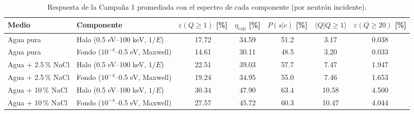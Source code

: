 \documentclass[11pt,a4paper]{article}
\begin{document}
\begin{table}[H]\centering\footnotesize\setlength{\tabcolsep}{3pt}\caption{Respuesta de la Campaña 1 promediada con el espectro de cada componente (por neutrón incidente).}\label{tab:c1}
\begin{tabular}{llccccc}\toprule
Medio & Componente & $\varepsilon(Q\geq1)$ [\%] & $\eta_\text{cap}$ [\%] & $P(s|c)$ [\%] & $\langle Q|Q\geq1\rangle$ & $\varepsilon(Q\geq20)$ [\%] \\\midrule
Agua pura & Halo (0.5 eV--100 keV, $1/E$) & 17.72 & 34.59 & 51.2 & 3.17 & 0.038 \\
Agua pura & Fondo ($10^{-4}$--0.5 eV, Maxwell) & 14.61 & 30.11 & 48.5 & 3.20 & 0.033 \\
\addlinespace
Agua + 2.5\,\% NaCl & Halo (0.5 eV--100 keV, $1/E$) & 22.51 & 39.03 & 57.7 & 7.47 & 1.947 \\
Agua + 2.5\,\% NaCl & Fondo ($10^{-4}$--0.5 eV, Maxwell) & 19.24 & 34.95 & 55.0 & 7.46 & 1.653 \\
\addlinespace
Agua + 10\,\% NaCl & Halo (0.5 eV--100 keV, $1/E$) & 30.34 & 47.90 & 63.4 & 10.58 & 4.500 \\
Agua + 10\,\% NaCl & Fondo ($10^{-4}$--0.5 eV, Maxwell) & 27.57 & 45.72 & 60.3 & 10.47 & 4.044 \\
\bottomrule\end{tabular}\end{table}
\end{document}
